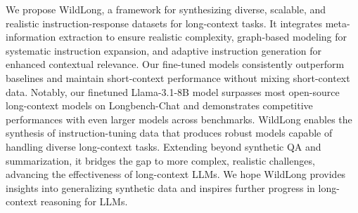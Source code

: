 We propose WildLong, a framework for synthesizing diverse, scalable, and realistic instruction-response datasets for long-context tasks. 
It integrates meta-information extraction to ensure realistic complexity, graph-based modeling for systematic instruction expansion, and adaptive instruction generation for enhanced contextual relevance.
Our fine-tuned models consistently outperform baselines and maintain short-context performance without mixing short-context data. Notably, our finetuned Llama-3.1-8B model surpasses most open-source long-context models on Longbench-Chat and demonstrates competitive performances with even larger models across benchmarks.
WildLong enables the synthesis of instruction-tuning data that produces robust models capable of handling diverse long-context tasks. Extending beyond synthetic QA and summarization, it bridges the gap to more complex, realistic challenges, advancing the effectiveness of long-context LLMs.
We hope WildLong provides insights into generalizing synthetic data and inspires further progress in long-context reasoning for LLMs.